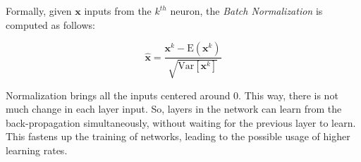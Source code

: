 Formally, given $\mathbf{x}$ inputs from the $k^{th}$ neuron, the \textit{Batch Normalization} is computed as follows:

\begin{equation}
	\hat{\mathbf{x}} = \frac{\mathbf{x}^k-\text{E}(\mathbf{x}^k)}{\sqrt{\text{Var}[\mathbf{x}^k]}}
\end{equation}


Normalization brings all the inputs centered around 0. This way, there is not much change in each layer input. So, layers in the network can learn from the back-propagation simultaneously, without waiting for the previous layer to learn. This fastens up the training of networks, leading to the possible usage of higher learning rates.





